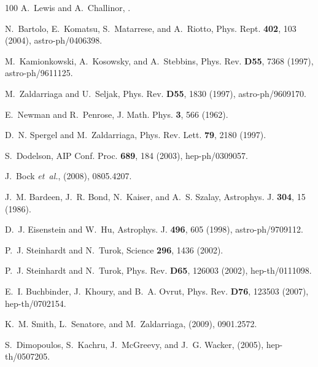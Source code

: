 \documentclass[12pt,letterpaper,rotate]{article}
\begin{document}
{\begin{thebibliography}{100}
A.~Lewis and A.~Challinor,
.

N.~Bartolo, E.~Komatsu, S.~Matarrese, and A.~Riotto,
\newblock Phys. Rept. {\bf 402}, 103 (2004), astro-ph/0406398.

M.~Kamionkowski, A.~Kosowsky, and A.~Stebbins,
\newblock Phys. Rev. {\bf D55}, 7368 (1997), astro-ph/9611125.

M.~Zaldarriaga and U.~Seljak,
\newblock Phys. Rev. {\bf D55}, 1830 (1997), astro-ph/9609170.

E.~Newman and R.~Penrose,
\newblock J. Math. Phys. {\bf 3}, 566 (1962).

D.~N. Spergel and M.~Zaldarriaga,
\newblock Phys. Rev. Lett. {\bf 79}, 2180 (1997).

S.~Dodelson,
\newblock AIP Conf. Proc. {\bf 689}, 184 (2003), hep-ph/0309057.

J.~Bock {\em et~al.},
\newblock (2008), 0805.4207.

J.~M. Bardeen, J.~R. Bond, N.~Kaiser, and A.~S. Szalay,
\newblock Astrophys. J. {\bf 304}, 15 (1986).

D.~J. Eisenstein and W.~Hu,
\newblock Astrophys. J. {\bf 496}, 605 (1998), astro-ph/9709112.

P.~J. Steinhardt and N.~Turok,
\newblock Science {\bf 296}, 1436 (2002).

P.~J. Steinhardt and N.~Turok,
\newblock Phys. Rev. {\bf D65}, 126003 (2002), hep-th/0111098.

E.~I. Buchbinder, J.~Khoury, and B.~A. Ovrut,
\newblock Phys. Rev. {\bf D76}, 123503 (2007), hep-th/0702154.

K.~M. Smith, L.~Senatore, and M.~Zaldarriaga,
\newblock (2009), 0901.2572.

S.~Dimopoulos, S.~Kachru, J.~McGreevy, and J.~G. Wacker,
\newblock (2005), hep-th/0507205.


\end{thebibliography}}
\end{document}
